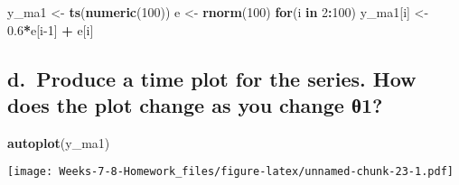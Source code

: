 \documentclass[]{article}
\newenvironment{Shaded}{\begin{snugshade}}{\end{snugshade}}
\newcommand{\ControlFlowTok}[1]{\textcolor[rgb]{0.13,0.29,0.53}{\textbf{#1}}}
\newcommand{\DecValTok}[1]{\textcolor[rgb]{0.00,0.00,0.81}{#1}}
\newcommand{\FloatTok}[1]{\textcolor[rgb]{0.00,0.00,0.81}{#1}}
\newcommand{\KeywordTok}[1]{\textcolor[rgb]{0.13,0.29,0.53}{\textbf{#1}}}
\newcommand{\NormalTok}[1]{#1}
\newcommand{\OperatorTok}[1]{\textcolor[rgb]{0.81,0.36,0.00}{\textbf{#1}}}
\newcommand{\StringTok}[1]{\textcolor[rgb]{0.31,0.60,0.02}{#1}}
\begin{document}
\begin{Shaded}
\begin{Highlighting}[]
\NormalTok{y_ma1 <-}\StringTok{ }\KeywordTok{ts}\NormalTok{(}\KeywordTok{numeric}\NormalTok{(}\DecValTok{100}\NormalTok{))}
\NormalTok{e <-}\StringTok{ }\KeywordTok{rnorm}\NormalTok{(}\DecValTok{100}\NormalTok{)}
\ControlFlowTok{for}\NormalTok{(i }\ControlFlowTok{in} \DecValTok{2}\OperatorTok{:}\DecValTok{100}\NormalTok{)}
\NormalTok{  y_ma1[i] <-}\StringTok{ }\FloatTok{0.6}\OperatorTok{*}\NormalTok{e[i}\DecValTok{-1}\NormalTok{] }\OperatorTok{+}\StringTok{ }\NormalTok{e[i]}
\end{Highlighting}
\end{Shaded}

\hypertarget{d.-produce-a-time-plot-for-the-series.-how-does-the-plot-change-as-you-change-1}{%
\subsection{d.~Produce a time plot for the series. How does the plot
change as you change
θ1?}\label{d.-produce-a-time-plot-for-the-series.-how-does-the-plot-change-as-you-change-1}}

\begin{Shaded}
\begin{Highlighting}[]
\KeywordTok{autoplot}\NormalTok{(y_ma1)}
\end{Highlighting}
\end{Shaded}

\texttt{[image: Weeks-7-8-Homework\_files/figure-latex/unnamed-chunk-23-1.pdf]}
\end{document}
